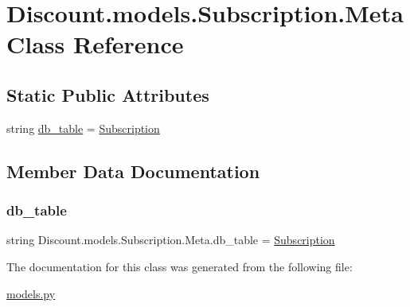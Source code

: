\hypertarget{class_discount_1_1models_1_1_subscription_1_1_meta}{}\section{Discount.\+models.\+Subscription.\+Meta Class Reference}
\label{class_discount_1_1models_1_1_subscription_1_1_meta}
\subsection*{Static Public Attributes}
\begin{DoxyCompactItemize}
\item 
string \hyperlink{class_discount_1_1models_1_1_subscription_1_1_meta_a54388d3cc73c2f51e99d79dcc55fbe96}{db\+\_\+table} = \textquotesingle{}\hyperlink{class_discount_1_1models_1_1_subscription}{Subscription}\textquotesingle{}
\end{DoxyCompactItemize}


\subsection{Member Data Documentation}
\mbox{\label{class_discount_1_1models_1_1_subscription_1_1_meta_a54388d3cc73c2f51e99d79dcc55fbe96}} 
\subsubsection{\texorpdfstring{db\+\_\+table}{db\_table}}
{\footnotesize\ttfamily string Discount.\+models.\+Subscription.\+Meta.\+db\+\_\+table = \textquotesingle{}\hyperlink{class_discount_1_1models_1_1_subscription}{Subscription}\textquotesingle{}\hspace{0.3cm}{\ttfamily [static]}}



The documentation for this class was generated from the following file\+:\begin{DoxyCompactItemize}
\item 
\hyperlink{models_8py}{models.\+py}\end{DoxyCompactItemize}
